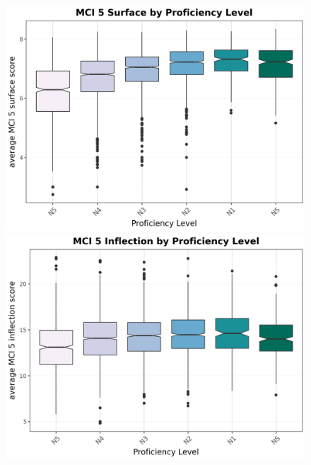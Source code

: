 \begin{figure}[htbp]
    \centering
    \begin{minipage}{.48\textwidth}
        \centering
    \includegraphics[scale=.4]{img/MCI5surface}
    \caption[MCI 5 surface scores across Proficiency levels]{}
        \label{fig:MCI5surface}
    \end{minipage}
    \hfill
\begin{minipage}{.48\textwidth}
        \centering
        \includegraphics[scale=.4]{img/MCI5inflection}
        \caption[MCI 5 inflection scores across Proficiency levels]{}
\label{fig:MCI5inflection}
\end{minipage}
    \end{figure}

